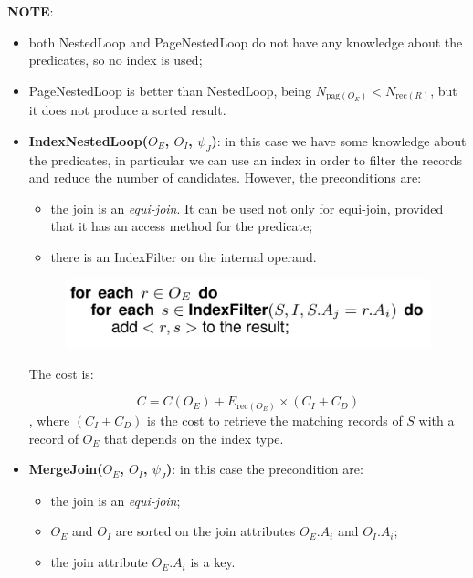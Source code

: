 \textbf{NOTE}:
\begin{itemize}
    \item both NestedLoop and PageNestedLoop do not have any knowledge about the predicates, so no index is used;
    \item PageNestedLoop is better than NestedLoop, being $N_{\text{pag}(O_E)} < N_{\text{rec}(R)}$, but it does not produce a sorted result.
\end{itemize}

\begin{itemize}
    \item \textbf{IndexNestedLoop($O_E$, $O_I$, $\psi_J$)}: in this case we have some knowledge about the predicates, in particular we can use an index in order to filter the records and reduce the number of candidates. However, the preconditions are:
    \begin{itemize}
        \item the join is an \textit{equi-join}. It can be used not only for equi-join, provided that it has an access method for the predicate;
        \item there is an IndexFilter on the internal operand.
    \end{itemize}

    \begin{figure}[h!]
		\centering
		\includegraphics[scale = 0.8]{img/relop9.jpg}
		\label{relop6}
    \end{figure}

    The cost is:

    $$
    C = C(O_E) + E_{\text{rec}(O_E)} \times (C_I + C_D)
    $$
    , where $(C_I +C_D)$ is the cost to retrieve the matching records of $S$ with a record of $O_E$ that depends on the index type.

    \item \textbf{MergeJoin($O_E$, $O_I$, $\psi_J$)}: in this case the precondition are:

    \begin{itemize}
        \item the join is an \textit{equi-join};
        \item $O_E$ and $O_I$ are sorted on the join attributes $O_E.A_i$ and $O_I.A_i$;
        \item the join attribute $O_E.A_i$ is a key.
    \end{itemize}


\end{itemize}
